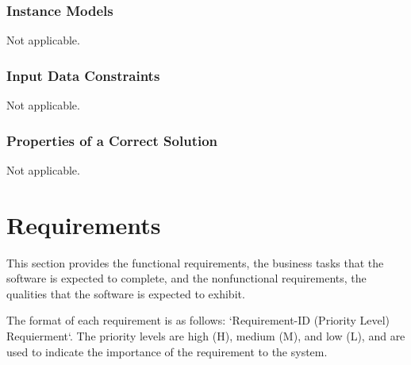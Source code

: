 \documentclass[12pt]{article}
\begin{document}
\subsubsection{Instance Models} \label{sec_instance}    
Not applicable.

\subsubsection{Input Data Constraints} \label{sec_DataConstraints}    
Not applicable.

\subsubsection{Properties of a Correct Solution} \label{sec_CorrectSolution} Not
applicable.


\newpage


\section{Requirements}

This section provides the functional requirements, the business tasks that the
software is expected to complete, and the nonfunctional requirements, the
qualities that the software is expected to exhibit.

The format of each requirement is as follows: `Requirement-ID (Priority Level)
Requierment`. The priority levels are high (H), medium (M), and low (L), and are
used to indicate the importance of the requirement to the system.
\end{document}
